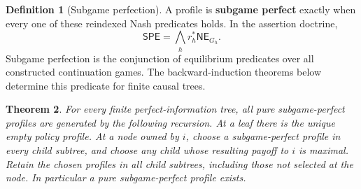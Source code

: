 \documentclass[11pt,a4paper]{article}
\numberwithin{equation}{section}
\newtheorem{theorem}{Theorem}[section]
\theoremstyle{definition}
\newtheorem{definition}[theorem]{Definition}
\theoremstyle{remark}
\theoremstyle{plain}
\begin{document}
\begin{definition}[Subgame perfection]
\label{def:egt-subgame-perfection}
A profile is \textbf{subgame perfect} exactly when every one of these reindexed
Nash predicates holds. In the assertion doctrine,
\begin{equation}
\label{eq:egt-spe-doctrine}
 \mathsf{SPE}
 =\bigwedge_h r_h^*\mathsf{NE}_{G_h}.
\end{equation}
Subgame perfection is the conjunction of equilibrium predicates over all constructed continuation games. The backward-induction theorems below
determine this predicate for finite causal trees.
\end{definition}

\begin{theorem}
\label{thm:egt-backward}
For every finite perfect-information tree, all pure subgame-perfect
profiles are generated by the following recursion. At a leaf there is
the unique empty policy profile. At a node owned by $i$, choose a
subgame-perfect profile in every child subtree, and choose any child
whose resulting payoff to $i$ is maximal. Retain the chosen profiles in
all child subtrees, including those not selected at the node.
In particular a pure subgame-perfect profile exists.
\end{theorem}
\end{document}
